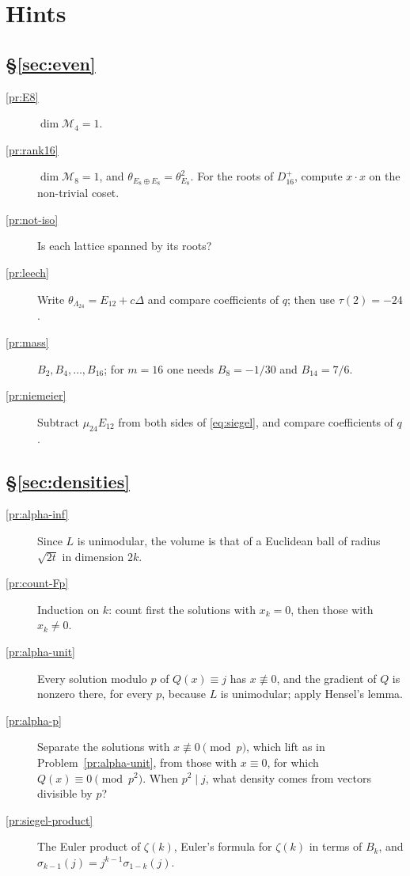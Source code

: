 \documentclass[reqno]{amsart}
\theoremstyle{definition}
\theoremstyle{plain}
\newcommand{\Mf}{\mathcal{M}}
\begin{document}
\section*{Hints}

\subsection*{\S\ref{sec:even}}
\begin{description}
\item[\ref{pr:E8}] \(\dim\Mf_4 = 1\).
\item[\ref{pr:rank16}] \(\dim \Mf_8 = 1\), and \(\theta_{E_8\oplus E_8} = \theta_{E_8}^2\).  For the roots of \(D_{16}^+\), compute \(x\cdot x\) on the non-trivial coset.
\item[\ref{pr:not-iso}] Is each lattice spanned by its roots?
\item[\ref{pr:leech}] Write \(\theta_{\Lambda_{24}} = E_{12} + c\Delta\) and compare coefficients of \(q\); then use \(\tau(2) = -24\).
\item[\ref{pr:mass}] \(B_2, B_4, \dots, B_{16}\); for \(m = 16\) one needs \(B_8 = -1/30\) and \(B_{14} = 7/6\).
\item[\ref{pr:niemeier}] Subtract \(\mu_{24}E_{12}\) from both sides of \eqref{eq:siegel}, and compare coefficients of \(q\).
\end{description}

\subsection*{\S\ref{sec:densities}}
\begin{description}
\item[\ref{pr:alpha-inf}] Since \(L\) is unimodular, the volume is that of a Euclidean ball of radius \(\sqrt{2t}\) in dimension \(2k\).
\item[\ref{pr:count-Fp}] Induction on \(k\): count first the solutions with \(x_k = 0\), then those with \(x_k \ne 0\).
\item[\ref{pr:alpha-unit}] Every solution modulo \(p\) of \(Q(x) \equiv j\) has \(x \not\equiv 0\), and the gradient of \(Q\) is nonzero there, for every \(p\), because \(L\) is unimodular; apply Hensel's lemma.
\item[\ref{pr:alpha-p}] Separate the solutions with \(x \not\equiv 0 \pmod p\), which lift as in Problem~\ref{pr:alpha-unit}, from those with \(x \equiv 0\), for which \(Q(x) \equiv 0 \pmod{p^2}\).  When \(p^2\mid j\), what density comes from vectors divisible by \(p\)?
\item[\ref{pr:siegel-product}] The Euler product of \(\zeta(k)\), Euler's formula for \(\zeta(k)\) in terms of \(B_k\), and \(\sigma_{k-1}(j) = j^{k-1}\sigma_{1-k}(j)\).
\end{description}
\end{document}

